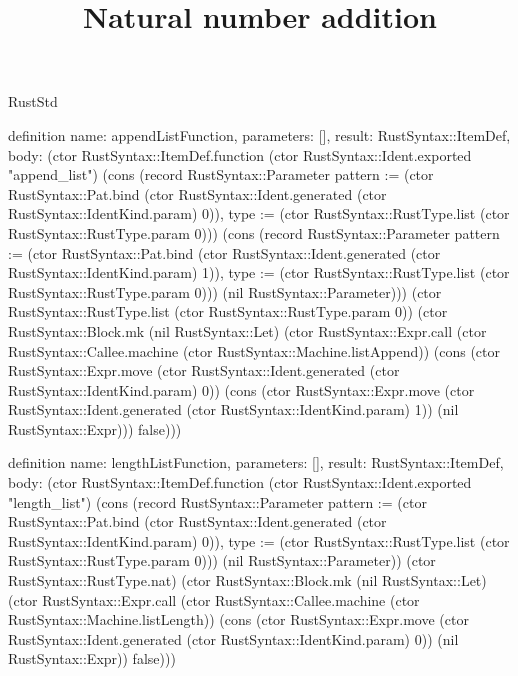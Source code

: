\begin{lexlean}{RustStd}
\title{Natural number addition}
\begin{semanticmodule}
definition{
  name: appendListFunction,
  parameters: [],
  result: RustSyntax::ItemDef,
  body: (ctor RustSyntax::ItemDef.function (ctor RustSyntax::Ident.exported "append_list") (cons (record RustSyntax::Parameter {pattern := (ctor RustSyntax::Pat.bind (ctor RustSyntax::Ident.generated (ctor RustSyntax::IdentKind.param) 0)), type := (ctor RustSyntax::RustType.list (ctor RustSyntax::RustType.param 0))}) (cons (record RustSyntax::Parameter {pattern := (ctor RustSyntax::Pat.bind (ctor RustSyntax::Ident.generated (ctor RustSyntax::IdentKind.param) 1)), type := (ctor RustSyntax::RustType.list (ctor RustSyntax::RustType.param 0))}) (nil RustSyntax::Parameter))) (ctor RustSyntax::RustType.list (ctor RustSyntax::RustType.param 0)) (ctor RustSyntax::Block.mk (nil RustSyntax::Let) (ctor RustSyntax::Expr.call (ctor RustSyntax::Callee.machine (ctor RustSyntax::Machine.listAppend)) (cons (ctor RustSyntax::Expr.move (ctor RustSyntax::Ident.generated (ctor RustSyntax::IdentKind.param) 0)) (cons (ctor RustSyntax::Expr.move (ctor RustSyntax::Ident.generated (ctor RustSyntax::IdentKind.param) 1)) (nil RustSyntax::Expr))) false)))
}

definition{
  name: lengthListFunction,
  parameters: [],
  result: RustSyntax::ItemDef,
  body: (ctor RustSyntax::ItemDef.function (ctor RustSyntax::Ident.exported "length_list") (cons (record RustSyntax::Parameter {pattern := (ctor RustSyntax::Pat.bind (ctor RustSyntax::Ident.generated (ctor RustSyntax::IdentKind.param) 0)), type := (ctor RustSyntax::RustType.list (ctor RustSyntax::RustType.param 0))}) (nil RustSyntax::Parameter)) (ctor RustSyntax::RustType.nat) (ctor RustSyntax::Block.mk (nil RustSyntax::Let) (ctor RustSyntax::Expr.call (ctor RustSyntax::Callee.machine (ctor RustSyntax::Machine.listLength)) (cons (ctor RustSyntax::Expr.move (ctor RustSyntax::Ident.generated (ctor RustSyntax::IdentKind.param) 0)) (nil RustSyntax::Expr)) false)))
}


\end{semanticmodule}
\end{lexlean}
